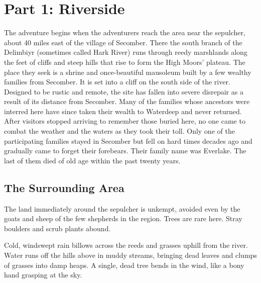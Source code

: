 \documentclass[10pt,a4paper,twoside,twocolumn,openany,bg=print,nodeprecatedcode]{dndbook}
\begin{document}
\chapter{Part 1: Riverside}
The adventure begins when the adventurers reach the area near the sepulcher, about 40 miles east of the village of Secomber. There the south branch of the Delimbiyr (sometimes called Hark River) runs through reedy marshlands along the feet of cliffs and steep hills that rise to form the High Moors' plateau.
The place they seek is a shrine and once-beautiful mausoleum built by a few wealthy families from Secomber. It is set into a cliff on the south side of the river. Designed to be rustic and remote, the site has fallen into severe disrepair as a result of its distance from Secomber. Many of the families whose ancestors were interred here have since taken their wealth to Waterdeep and never returned. After visitors stopped arriving to remember those buried here, no one came to combat the weather and the waters as they took their toll.
Only one of the participating families stayed in Secomber but fell on hard times decades ago and gradually came to forget their forebears. Their family name was Everlake. The last of them died of old age within the past twenty years.
\section{The Surrounding Area}
The land immediately around the sepulcher is unkempt, avoided even by the goats and sheep of the few shepherds in the region. Trees are rare here. Stray boulders and scrub plants abound.
\begin{DndReadAloud}{}
Cold, windswept rain billows across the reeds and grasses uphill from the river. Water runs off the hills above in muddy streams, bringing dead leaves and clumps of grasses into damp heaps. A single, dead tree bends in the wind, like a bony hand grasping at the sky.
\end{DndReadAloud}
\end{document}

